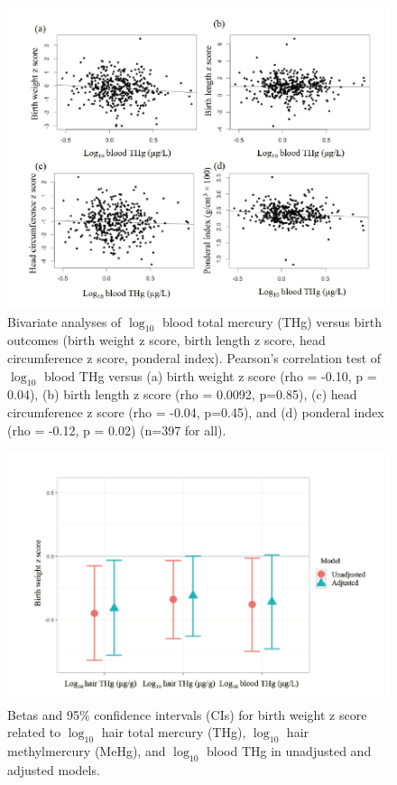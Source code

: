 \begin{figure}
  \centering
    \label{fig:Fig318}
  \includegraphics[scale=1]{Figures/Fig318.pdf}
  \caption[Bivariate analyses of $\log_{10}$ blood total mercury versus birth outcomes (birth weight z score, birth length z score, head circumference z score, ponderal index)]{Bivariate analyses of $\log_{10}$ blood total mercury (THg) versus birth outcomes (birth weight z score, birth length z score, head circumference z score, ponderal index). Pearson's correlation test of $\log_{10}$ blood THg versus (a) birth weight z score (rho = -0.10, p = 0.04), (b) birth length z score (rho = 0.0092, p=0.85), (c) head circumference z score (rho = -0.04, p=0.45), and (d) ponderal index (rho = -0.12, p = 0.02) (n=397 for all).}
\end{figure}


\begin{figure}
  \centering
    \label{fig:Fig319}
  \includegraphics[scale=1]{Figures/Fig319.pdf}
  \caption[Betas and 95\% confidence intervals for birth weight z score related to $\log_{10}$ hair total mercury, $\log_{10}$ hair methylmercury, and $\log_{10}$ blood total mercury in unadjusted and adjusted models]{Betas and 95\% confidence intervals (CIs) for birth weight z score related to $\log_{10}$ hair total mercury (THg), $\log_{10}$ hair methylmercury (MeHg), and $\log_{10}$ blood THg in unadjusted and adjusted models.}
\end{figure}


